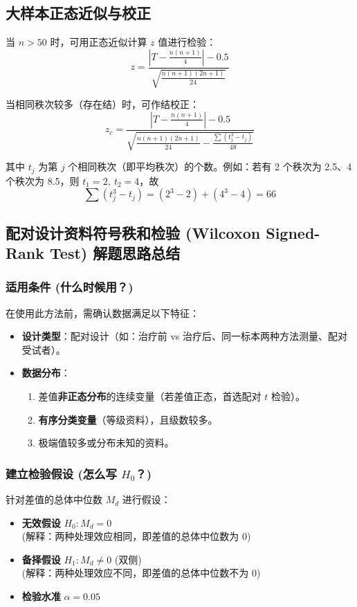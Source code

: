 \documentclass[lang=cn,10pt]{elegantbook}
\begin{document}
\subsection{大样本正态近似与校正}
当 $n>50$ 时，可用正态近似计算 $z$ 值进行检验：
\[
z = \frac{\left|T-\frac{n(n+1)}{4}\right|-0.5}{\sqrt{\frac{n(n+1)(2n+1)}{24}}}
\]

当相同秩次较多（存在结）时，可作结校正：
\[
z_c = \frac{\left|T-\frac{n(n+1)}{4}\right|-0.5}{\sqrt{\frac{n(n+1)(2n+1)}{24}-\frac{\sum\left(t_j^3-t_j\right)}{48}}}
\]

其中 $t_j$ 为第 $j$ 个相同秩次（即平均秩次）的个数。例如：若有 2 个秩次为 2.5、4 个秩次为 8.5，则 $t_1=2,\ t_2=4$，故
\[
\sum\left(t_j^3-t_j\right)=(2^3-2)+(4^3-4)=66
\]


\subsection{配对设计资料符号秩和检验 (Wilcoxon Signed-Rank Test) 解题思路总结}

\subsubsection{适用条件 (什么时候用？)}
在使用此方法前，需确认数据满足以下特征：
\begin{itemize}
    \item \textbf{设计类型}：配对设计（如：治疗前 vs 治疗后、同一标本两种方法测量、配对受试者）。
    \item \textbf{数据分布}：
    \begin{enumerate}
        \item 差值\textbf{非正态分布}的连续变量（若差值正态，首选配对 $t$ 检验）。
        \item \textbf{有序分类变量}（等级资料），且级数较多。
        \item 极端值较多或分布未知的资料。
    \end{enumerate}
\end{itemize}

\subsubsection{建立检验假设 (怎么写 $H_0$？)}
针对差值的总体中位数 $M_d$ 进行假设：
\begin{itemize}
    \item \textbf{无效假设} $H_0: M_d = 0$ \\
    (解释：两种处理效应相同，即差值的总体中位数为 0)
    \item \textbf{备择假设} $H_1: M_d \ne 0$ (双侧) \\
    (解释：两种处理效应不同，即差值的总体中位数不为 0)
    \item \textbf{检验水准} $\alpha = 0.05$
\end{itemize}
\end{document}
